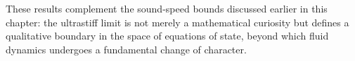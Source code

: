 \begin{relcorrection}
These results complement the sound-speed bounds discussed
earlier in this chapter: the ultrastiff limit is not merely a
mathematical curiosity but defines a qualitative boundary in the
space of equations of state, beyond which fluid dynamics undergoes
a fundamental change of character.
\end{relcorrection}
